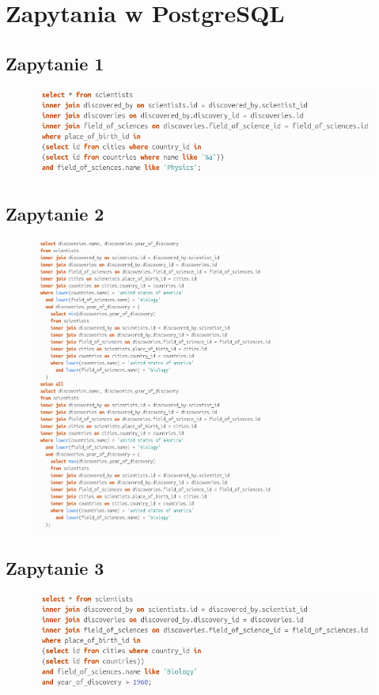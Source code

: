 \documentclass[11pt]{article}
\begin{document}
\newpage
\section{Zapytania w PostgreSQL}
	\subsection{Zapytanie 1}
		\begin{figure}[!ht]
			\begin{center}
				\includegraphics[width=\textwidth]{s1.png}
			\end{center}
		\end{figure}
	\subsection{Zapytanie 2}
		\begin{figure}[!ht]
			\begin{center}
				\includegraphics[width=300px]{s2.png}
			\end{center}
		\end{figure}

\newpage
	\subsection{Zapytanie 3}
		\begin{figure}[!ht]
			\begin{center}
				\includegraphics[width=\textwidth]{s3.png}
			\end{center}
		\end{figure}
\end{document}
